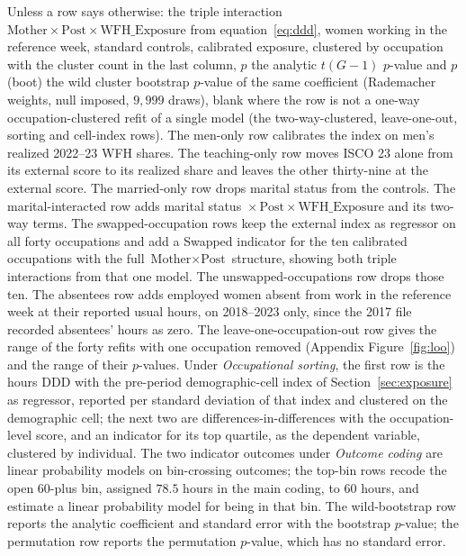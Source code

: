 \documentclass[12pt,a4paper]{article}
\newcommand{\Mother}{\text{Mother}}
\newcommand{\Post}{\text{Post}}
\newcommand{\WFH}{\text{WFH\_Exposure}}
\begin{document}
\begin{table}[htbp]
\centering
\begin{threeparttable}
\caption{Hours DDD: sensitivity of $\Mother \times \Post \times \WFH$}\label{tab:robust}
\renewcommand{\baselinestretch}{1}\scriptsize
\setlength{\tabcolsep}{2pt} %

\begin{tablenotes}\footnotesize
\item Unless a row says otherwise: the triple interaction $\Mother \times \Post \times \WFH$
from equation~\eqref{eq:ddd}, women working in the reference week, standard controls, calibrated
exposure, clustered by occupation with the cluster count in the last column, $p$ the
analytic $t(G-1)$ $p$-value and $p$ (boot) the wild cluster bootstrap $p$-value of the same
coefficient (Rademacher weights, null imposed, $9{,}999$ draws), blank where the row is not a
one-way occupation-clustered refit of a single model (the two-way-clustered, leave-one-out,
sorting and cell-index rows). The men-only row calibrates the index on men's realized 2022--23 WFH
shares. The teaching-only row moves ISCO 23 alone from its external score to its realized share
and leaves the other thirty-nine at the external score. The married-only row drops marital
status from the controls. The marital-interacted row adds marital status ${} \times \Post \times
\WFH$ and its two-way terms. The swapped-occupation rows keep the external index as regressor
on all forty occupations and add a Swapped indicator for the ten calibrated occupations with the
full $\Mother \times \Post$ structure, showing both triple interactions from that one model. The
unswapped-occupations row drops those ten. The absentees row adds employed women absent from
work in the reference week at their reported usual hours, on 2018--2023 only, since the 2017
file recorded absentees' hours as zero. The leave-one-occupation-out row gives the range of
the forty refits with one occupation removed (Appendix Figure~\ref{fig:loo}) and the range of
their $p$-values. Under \emph{Occupational sorting}, the first row is the hours DDD with the
pre-period demographic-cell index of Section~\ref{sec:exposure} as regressor, reported per
standard deviation of that index and clustered on the demographic cell; the next two are
differences-in-differences with the occupation-level score, and an indicator for its top
quartile, as the dependent variable, clustered by individual. The two indicator outcomes under
\emph{Outcome coding} are linear probability models on bin-crossing outcomes; the top-bin rows
recode the open $60$-plus bin, assigned $78.5$ hours in the main coding, to $60$ hours, and
estimate a linear probability model for being in that bin. The wild-bootstrap
row reports the analytic coefficient and standard error with the bootstrap $p$-value; the
permutation row reports the permutation $p$-value, which has no standard error.
\end{tablenotes}
\end{threeparttable}
\end{table}
\end{document}
